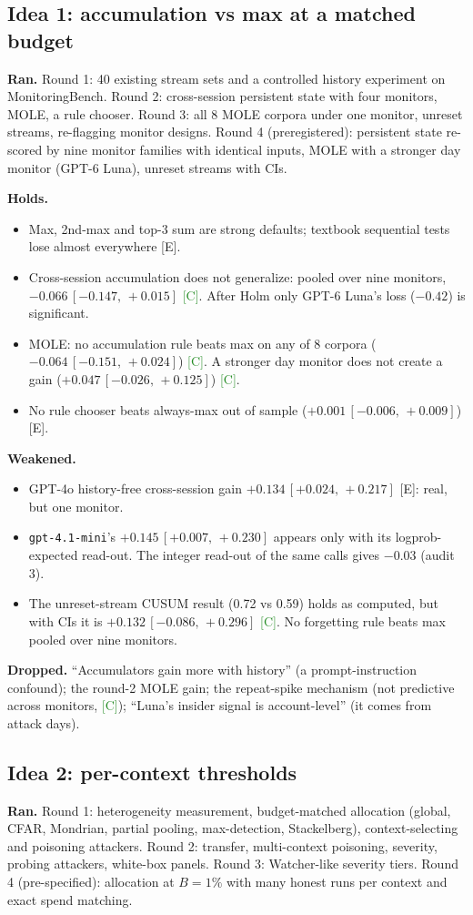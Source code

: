 \documentclass[11pt]{article}
\newcommand{\tC}{\textsf{\scriptsize\textcolor{ForestGreen}{[C]}}\xspace}
\newcommand{\tE}{\textsf{\scriptsize\textcolor{ink2}{[E]}}\xspace}
\newcommand{\ci}[2]{\,[#1,\,#2]}
\begin{document}
\subsection{Idea 1: accumulation vs max at a matched budget}
\textbf{Ran.} Round 1: 40 existing stream sets and a controlled history experiment on MonitoringBench. Round 2: cross-session persistent state with four monitors, MOLE, a rule chooser. Round 3: all 8 MOLE corpora under one monitor, unreset streams, re-flagging monitor designs. Round 4 (preregistered): persistent state re-scored by nine monitor families with identical inputs, MOLE with a stronger day monitor (GPT-6 Luna), unreset streams with CIs.

\textbf{Holds.}
\begin{itemize}
\item Max, 2nd-max and top-3 sum are strong defaults; textbook sequential tests lose almost everywhere \tE.
\item Cross-session accumulation does not generalize: pooled over nine monitors, $-0.066\ci{-0.147}{+0.015}$ \tC. After Holm only GPT-6 Luna's loss ($-0.42$) is significant.
\item MOLE: no accumulation rule beats max on any of 8 corpora ($-0.064\ci{-0.151}{+0.024}$) \tC. A stronger day monitor does not create a gain ($+0.047\ci{-0.026}{+0.125}$) \tC.
\item No rule chooser beats always-max out of sample ($+0.001\ci{-0.006}{+0.009}$) \tE.
\end{itemize}
\textbf{Weakened.}
\begin{itemize}
\item GPT-4o history-free cross-session gain $+0.134\ci{+0.024}{+0.217}$ \tE: real, but one monitor.
\item \texttt{gpt-4.1-mini}'s $+0.145\ci{+0.007}{+0.230}$ appears only with its logprob-expected read-out. The integer read-out of the same calls gives $-0.03$ (audit 3).
\item The unreset-stream CUSUM result (0.72 vs 0.59) holds as computed, but with CIs it is $+0.132\ci{-0.086}{+0.296}$ \tC. No forgetting rule beats max pooled over nine monitors.
\end{itemize}
\textbf{Dropped.} ``Accumulators gain more with history'' (a prompt-instruction confound); the round-2 MOLE gain; the repeat-spike mechanism (not predictive across monitors, \tC); ``Luna's insider signal is account-level'' (it comes from attack days).

\subsection{Idea 2: per-context thresholds}
\textbf{Ran.} Round 1: heterogeneity measurement, budget-matched allocation (global, CFAR, Mondrian, partial pooling, max-detection, Stackelberg), context-selecting and poisoning attackers. Round 2: transfer, multi-context poisoning, severity, probing attackers, white-box panels. Round 3: Watcher-like severity tiers. Round 4 (pre-specified): allocation at $B=1\%$ with many honest runs per context and exact spend matching.
\end{document}
